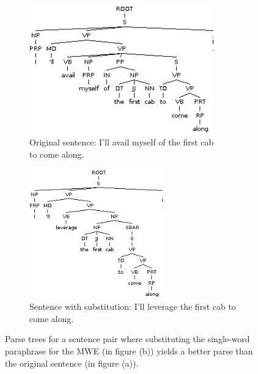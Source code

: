 \documentclass[11pt]{article}
\begin{document}
\begin{itemize}
\begin{figure}
\centering
\begin{subfigure}{.5\textwidth}
  \centering
  \includegraphics[width=80mm]{figs/avail_myself_of_tree.png}
  \caption{Original sentence: I'll avail myself of the first cab \\ to come along.}
  \label{fig:sub1}
\end{subfigure}%
\begin{subfigure}{.5\textwidth}
  \centering
  \includegraphics[width=58mm]{figs/leverage_tree.png}
  \caption{Sentence with substitution: I'll leverage the first cab to come along.}
  \label{fig:sub2}
\end{subfigure}
\caption{Parse trees for a sentence pair where substituting the single-word paraphrase for the MWE (in figure (b)) yields a better parse than the original sentence (in figure (a)).}
\label{avail}
\end{figure}



\end{itemize}
\end{document}
